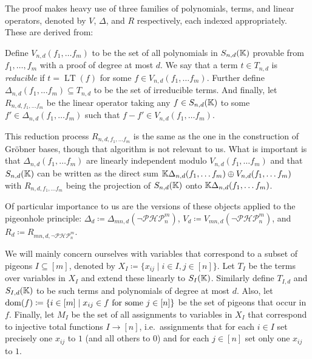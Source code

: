 \documentclass{article}
\newcommand{\Snd}{S_{n, d}(\KK)}
\newcommand{\PHP}{\ensuremath{\neg \mathcal{PHP}^m_n}\xspace}
\newcommand{\LT}{\operatorname{LT}}
\begin{document}
The proof makes heavy use of three families of polynomials, terms, and linear operators, denoted by $V$, $\Delta$, and $R$ respectively, each indexed appropriately. These are derived from:
\begin{definition}
    Define $V_{n, d}(f_1, \ldots f_m)$ to be the set of all polynomials in $\Snd$ provable from $f_1, \ldots, f_m$ with a proof of degree at most $d$. We say that a term $t \in T_{n, d}$ is \textit{reducible} if $t = \LT(f)$ for some $f \in V_{n, d}(f_1, \ldots f_m)$. Further define $\Delta_{n, d}(f_1, \ldots f_m) \subseteq T_{n, d}$ to be the set of irreducible terms. And finally, let $R_{n, d, f_1, \ldots f_m}$ be the linear operator taking any $f \in \Snd$ to some $f' \in \Delta_{n, d}(f_1, \ldots f_m)$ such that $f - f' \in V_{n, d}(f_1, \ldots f_m)$.
\end{definition}
This reduction process $R_{n, d, f_1, \ldots f_m}$ is the same as the one in the construction of Gröbner bases, though that algorithm is not relevant to us. What is important is that $\Delta_{n, d}(f_1, \ldots f_m)$ are linearly independent modulo $V_{n, d}(f_1, \ldots f_m)$ and that $\Snd$ can be written as the direct sum $\mathbb{K} \Delta_{n, d}(f_1, \ldots f_m) \oplus V_{n, d}(f_1, \ldots f_m)$ with $R_{n, d, f_1, \ldots f_m}$ being the projection of $\Snd$ onto $\mathbb{K} \Delta_{n, d}(f_1, \ldots f_m)$.

Of particular importance to us are the versions of these objects applied to the pigeonhole principle: $\Delta_d \coloneqq \Delta_{mn, d}(\PHP)$, $V_d \coloneqq V_{mn, d}(\PHP)$, and $R_d \coloneqq R_{mn, d, \PHP}$.

We will mainly concern ourselves with variables that correspond to a subset of pigeons $I \subseteq [m]$, denoted by $X_I \coloneqq \{x_{ij} \mid i \in I, j \in [n]\}$. Let $T_I$ be the terms over variables in $X_I$ and extend these linearly to $S_I(\mathbb{K})$. Similarly define $T_{I, d}$ and $S_{I, d}(\mathbb{K})$ to be such terms and polynomials of degree at most $d$. Also, let $\operatorname{dom}(f) \coloneqq \{i \in [m] \mid x_{ij} \in f \text{ for some } j \in [n]\}$ be the set of pigeons that occur in $f$. Finally, let $M_I$ be the set of all assignments to variables in $X_I$ that correspond to injective total functions $I \to [n]$, i.e.\ assignments that for each $i \in I$ set precisely one $x_{ij}$ to $1$ (and all others to $0$) and for each $j \in [n]$ set only one $x_{ij}$ to $1$.
\end{document}
